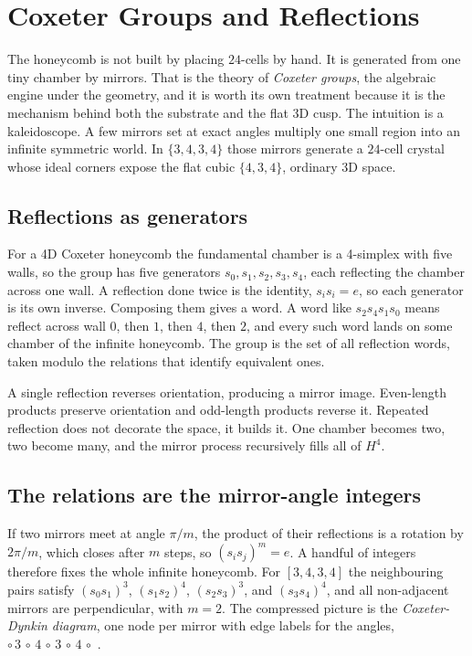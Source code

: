 \section{Coxeter Groups and Reflections}

The honeycomb is not built by placing $24$-cells by hand. It is generated from one tiny chamber by mirrors. That is the theory of \emph{Coxeter groups}, the algebraic engine under the geometry, and it is worth its own treatment because it is the mechanism behind both the substrate and the flat 3D cusp. The intuition is a kaleidoscope. A few mirrors set at exact angles multiply one small region into an infinite symmetric world. In $\{3,4,3,4\}$ those mirrors generate a $24$-cell crystal whose ideal corners expose the flat cubic $\{4,3,4\}$, ordinary 3D space.

\subsection{Reflections as generators}

For a 4D Coxeter honeycomb the fundamental chamber is a 4-simplex with five walls, so the group has five generators $s_0, s_1, s_2, s_3, s_4$, each reflecting the chamber across one wall. A reflection done twice is the identity, $s_i s_i = e$, so each generator is its own inverse. Composing them gives a word. A word like $s_2 s_4 s_1 s_0$ means reflect across wall $0$, then $1$, then $4$, then $2$, and every such word lands on some chamber of the infinite honeycomb. The group is the set of all reflection words, taken modulo the relations that identify equivalent ones.

A single reflection reverses orientation, producing a mirror image. Even-length products preserve orientation and odd-length products reverse it. Repeated reflection does not decorate the space, it builds it. One chamber becomes two, two become many, and the mirror process recursively fills all of $H^4$.

\subsection{The relations are the mirror-angle integers}

If two mirrors meet at angle $\pi/m$, the product of their reflections is a rotation by $2\pi/m$, which closes after $m$ steps, so $(s_i s_j)^m = e$. A handful of integers therefore fixes the whole infinite honeycomb. For $[3,4,3,4]$ the neighbouring pairs satisfy $(s_0 s_1)^3$, $(s_1 s_2)^4$, $(s_2 s_3)^3$, and $(s_3 s_4)^4$, and all non-adjacent mirrors are perpendicular, with $m = 2$. The compressed picture is the \emph{Coxeter-Dynkin diagram}, one node per mirror with edge labels for the angles, $\circ\,3\,\circ\,4\,\circ\,3\,\circ\,4\,\circ$ \cite{coxeter1973}.

